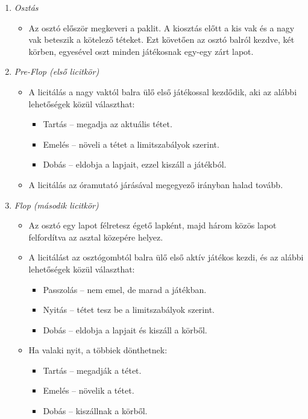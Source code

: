 \documentclass[]{thesis-ekf}
\theoremstyle{definition}
\theoremstyle{remark}
\begin{document}
\begin{enumerate}
	\item \emph{Osztás}
	\begin{itemize}
		\item Az osztó először megkeveri a paklit. A kiosztás előtt a kis vak és a nagy vak beteszik a kötelező téteket. Ezt követően az osztó balról kezdve, két körben, egyesével oszt minden játékosnak egy-egy zárt lapot.
	\end{itemize}
	\item \emph{Pre-Flop (első licitkör)}
	\begin{itemize}
		\item A licitálás a nagy vaktól balra ülő első játékossal kezdődik, aki az alábbi lehetőségek közül választhat:
		\begin{itemize}
			\item Tartás -- megadja az aktuális tétet.
			\item Emelés -- növeli a tétet a limitszabályok szerint.
			\item Dobás -- eldobja a lapjait, ezzel kiszáll a játékból.
		\end{itemize}
		\item A licitálás az óramutató járásával megegyező irányban halad tovább.
	\end{itemize}
	\item \emph{Flop (második licitkör)}
	\begin{itemize}
		\item Az osztó egy lapot félretesz égető lapként, majd három közös lapot felfordítva az asztal közepére helyez.
		\item A licitálást az osztógombtól balra ülő első aktív játékos kezdi, és az alábbi lehetőségek közül választhat:
		\begin{itemize}
			\item Passzolás -- nem emel, de marad a játékban.
			\item Nyitás -- tétet tesz be a limitszabályok szerint.
			\item Dobás -- eldobja a lapjait és kiszáll a körből.
		\end{itemize}
		\item Ha valaki nyit, a többiek dönthetnek:
		\begin{itemize}
			\item Tartás -- megadják a tétet.
			\item Emelés -- növelik a tétet.
			\item Dobás -- kiszállnak a körből.
		\end{itemize}

\end{itemize}
\end{enumerate}
\end{document}

